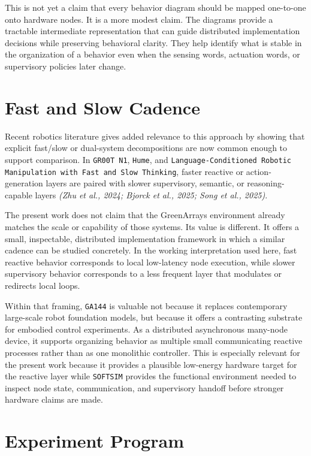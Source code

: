 \documentclass[11pt]{article}
\begin{document}
This is not yet a claim that every behavior diagram should be mapped
one-to-one onto hardware nodes. It is a more modest claim. The
diagrams provide a tractable intermediate representation that can guide
distributed implementation decisions while preserving behavioral
clarity. They help identify what is stable in the organization of a
behavior even when the sensing words, actuation words, or supervisory
policies later change.

\section*{Fast and Slow Cadence}

Recent robotics literature gives added relevance to this approach by
showing that explicit fast/slow or dual-system decompositions are now
common enough to support comparison. In \texttt{GR00T N1}, \texttt{Hume},
and \texttt{Language-Conditioned Robotic Manipulation with Fast and
Slow Thinking}, faster reactive or action-generation layers are paired
with slower supervisory, semantic, or reasoning-capable layers
\textit{(Zhu et al., 2024; Bjorck et al., 2025; Song et al., 2025)}.

The present work does not claim that the GreenArrays environment
already matches the scale or capability of those systems. Its value is
different. It offers a small, inspectable, distributed implementation
framework in which a similar cadence can be studied concretely. In the
working interpretation used here, fast reactive behavior corresponds to
local low-latency node execution, while slower supervisory behavior
corresponds to a less frequent layer that modulates or redirects local
loops.

Within that framing, \texttt{GA144} is valuable not because it replaces
contemporary large-scale robot foundation models, but because it offers
a contrasting substrate for embodied control experiments. As a
distributed asynchronous many-node device, it supports organizing
behavior as multiple small communicating reactive processes rather than
as one monolithic controller. This is especially relevant for the
present work because it provides a plausible low-energy hardware target
for the reactive layer while \texttt{SOFTSIM} provides the functional
environment needed to inspect node state, communication, and
supervisory handoff before stronger hardware claims are made.

\section*{Experiment Program}
\end{document}
